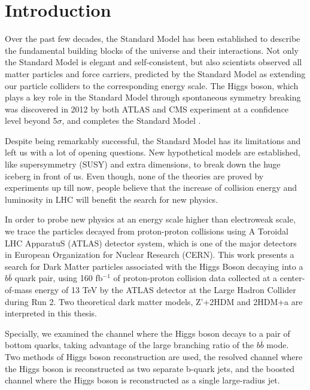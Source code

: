 \chapter{Introduction}

\label{ch:intro}
\par Over the past few decades, the Standard Model has been established to describe the fundamental building blocks of the universe and their interactions.
 Not only the Standard Model is elegant and self-consistent, but also scientists observed all matter particles and force carriers, predicted by the Standard Model as extending our particle colliders to the corresponding energy scale.
The Higgs boson, which plays a key role in the Standard Model through spontaneous symmetry breaking was discovered in 2012 by both ATLAS and CMS experiment at a confidence level beyond 5$\sigma$, 
and completes the Standard Model\cite{Aad:2012tfa} \cite{Chatrchyan:2012xdj}.

\par Despite being remarkably successful, the Standard Model has its limitations and left us with a lot of opening questions. 
New hypothetical models are established, like supersymmetry (SUSY) and extra dimensions,
to break down the huge iceberg in front of us. Even though, none of the theories are proved by experiments up till now, 
people believe that the increase of collision energy and luminosity in LHC will benefit the search for new physics.

\par In order to probe new physics at an energy scale higher than electroweak scale,
 we trace the particles decayed from proton-proton collisions using A Toroidal LHC ApparatuS (ATLAS) detector system,
 which is one of the major detectors in European Organization for Nuclear Research (CERN). This work presents a search for Dark Matter particles associated
with the Higgs Boson decaying into a $b\bar{b}$ quark pair, using 160 fb$ ^{-1}$ of proton-proton collision data collected at a center-of-mass energy of 13 TeV
by the ATLAS detector at the Large Hadron Collider during Run 2. Two theoretical dark matter models, Z'+2HDM and 
2HDM+a are interpreted in this thesis.

\par Specially, we examined the channel where the Higgs boson decays to a pair of bottom quarks, taking advantage of the large branching ratio of the $b\bar{b}$ mode. 
Two methods of Higgs boson reconstruction are used, the resolved channel where the Higgs boson is reconstructed as two separate b-quark jets, 
and the boosted channel where the Higgs boson is reconstructed as a single large-radius jet.

